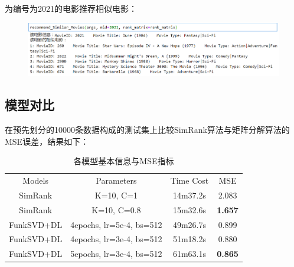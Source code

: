 \begin{spacing}{1.5}
\begin{figure}[h]
\end{figure}\par
\par
为编号为2021的电影推荐相似电影：\par
\begin{figure}[H]
\setlength{\abovecaptionskip}{0.0cm}
\setlength{\belowcaptionskip}{-0.cm}
\centering
\includegraphics[width=1\textwidth]{Figure/svd2.png}
\end{figure}\par
\par
\clearpage


\subsection{模型对比}
在预先划分的10000条数据构成的测试集上比较SimRank算法与矩阵分解算法的MSE误差，结果如下：\par
\begin{table}[h]
\centering
\caption{各模型基本信息与MSE指标}
\label{tab:1}
\begin{tabular}{cccc}
\toprule[2pt]
Models & Parameters & Time Cost & MSE  \\
\noalign{\smallskip}\hline\noalign{\smallskip}
SimRank & K=10, C=1 & 14m37.2s & 2.083 \\
SimRank & K=10, C=0.8& 15m32.6s & \textbf{1.657} \\
\hline\noalign{\smallskip}
FunkSVD+DL & 4epochs, lr=5e-4, bs=512 & 49m26.7s & 0.899 \\
FunkSVD+DL & 4epochs, lr=3e-4, bs=512 & 51m18.2s & 0.880 \\
FunkSVD+DL & 5epochs, lr=3e-4, bs=512 & 61m63.1s & \textbf{0.865} \\

\toprule[2pt]
\end{tabular}


\end{table}


\end{spacing}

\clearpage


\printbibliography%
